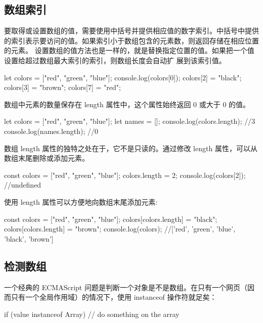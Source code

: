 \subsection{数组索引}
要取得或设置数组的值，需要使用中括号并提供相应值的数字索引。中括号中提供的索引表示要访问的值。如果索引小于数组包含的元素数，则返回存储在相应位置的元素。 设置数组的值方法也是一样的，就是替换指定位置的值。如果把一个值设置给超过数组最大索引的索引，则数组长度会自动扩
展到该索引值。
\begin{js}
    let colors = ["red", "green", "blue"];
    console.log(colors[0]);
    colors[2] = "black";
    colors[3] = "brown";
    colors[7] = "red";
\end{js}

数组中元素的数量保存在 length 属性中，这个属性始终返回 0 或大于 0 的值。
\begin{js}
    let colors = ["red", "green", "blue"];
    let names = [];
    console.log(colors.length); //3
    console.log(names.length); //0
\end{js}

数组 length 属性的独特之处在于，它不是只读的。通过修改 length 属性，可以从数组末尾删除或添加元素。

\begin{js}
    const colors = ["red", "green", "blue"];
    colors.length = 2;
    console.log(colors[2]); //undefined
\end{js}

使用 length 属性可以方便地向数组末尾添加元素:
\begin{js}
    const colors = ["red", "green", "blue"];
    colors[colors.length] = "black";
    colors[colors.length] = "brown";
    console.log(colors); //['red', 'green', 'blue', 'black', 'brown']
\end{js}

\subsection{检测数组}
一个经典的 ECMAScript 问题是判断一个对象是不是数组。在只有一个网页（因而只有一个全局作用域）的情况下，使用 instanceof 操作符就足矣：
\begin{js}
    if (value instanceof Array) {
            // do something on the array
        }
\end{js}

